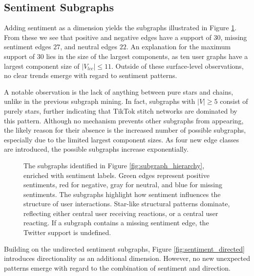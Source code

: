 \subsection{Sentiment Subgraphs}

Adding sentiment as a dimension yields the subgraphs illustrated in Figure \ref{fig:sentiment_subgraphs}. From these we see that positive and negative edges have a support of $30$, missing sentiment edges $27$, and neutral edges $22$. An explanation for the maximum support of $30$ lies in the size of the largest components, as ten user graphs have a largest component size of $|V_{lcc}| \leq 11$. Outside of these surface-level observations, no clear trends emerge with regard to sentiment patterns. 

A notable observation is the lack of anything between pure stars and chains, unlike in the previous subgraph mining. In fact, subgraphs with $|V| \geq 5$ consist of purely stars, further indicating that TikTok stitch networks are dominated by this pattern. Although no mechanism prevents other subgraphs from appearing, the likely reason for their absence is the increased number of possible subgraphs, especially due to the limited largest component sizes. As four new edge classes are introduced, the possible subgraphs increase exponentially.  

\begin{figure}[h]
    \centering
    \begin{adjustwidth}{-\textwidth}{-\textwidth}
        \centering
        
    \end{adjustwidth}
    \caption{The subgraphs identified in Figure \ref{fig:subgraph_hierarchy}, enriched with sentiment labels. Green edges represent \textcolor{SentimentPositive}{positive} sentiments, red for \textcolor{SentimentNegative}{negative}, gray for \textcolor{SentimentNeutral}{neutral}, and blue for \textcolor{SentimentMissing}{missing} sentiments. The subgraphs highlight how sentiment influences the structure of user interactions. Star-like structural patterns dominate, reflecting either central user receiving reactions, or a central user reacting. If a subgraph contains a \textcolor{SentimentMissing}{missing} sentiment edge, the Twitter support is undefined.}
    \label{fig:sentiment_subgraphs}
\end{figure}

Building on the undirected sentiment subgraphs, Figure \ref{fig:sentiment_directed} introduces directionality as an additional dimension. However, no new unexpected patterns emerge with regard to the combination of sentiment and direction. 

